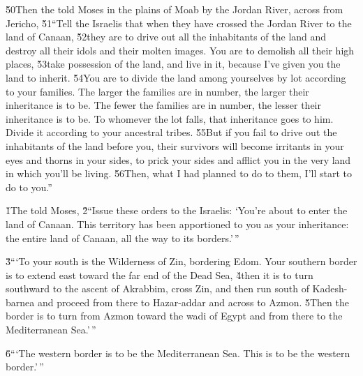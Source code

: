 \v{50}Then the  told Moses in the plains of Moab by the Jordan River, across from Jericho, \v{51}``Tell the Israelis that when they have crossed the Jordan River to the land of Canaan, \v{52}they are to drive out all the inhabitants of the land and destroy all their idols and their molten images. You are to demolish all their high places, \v{53}take possession of the land, and live in it, because I've given you the land to inherit. \v{54}You are to divide the land among yourselves by lot according to your families. The larger the families are in number, the larger their inheritance is to be. The fewer the families are in number, the lesser their inheritance is to be. To whomever the lot falls, that inheritance goes to him. Divide it according to your ancestral tribes. \v{55}But if you fail to drive out the inhabitants of the land before you, their survivors will become irritants in your eyes and thorns in your sides, to prick your sides and afflict you in the very land in which you'll be living. \v{56}Then, what I had planned to do to them, I'll start to do to you.''

\v{1}The  told Moses, \v{2}``Issue these orders to the Israelis: `You're about to enter the land of Canaan. This territory has been apportioned to you as your inheritance: the entire land of Canaan, all the way to its borders.'\,''

\v{3}```To your south is the Wilderness of Zin, bordering Edom. Your southern border is to extend east toward the far end of the Dead Sea, \v{4}then it is to turn southward to the ascent of Akrabbim, cross Zin, and then run south of Kadesh-barnea and proceed from there to Hazar-addar and across to Azmon. \v{5}Then the border is to turn from Azmon toward the wadi of Egypt and from there to the Mediterranean Sea.'\,''

\v{6}```The western border is to be the Mediterranean Sea. This is to be the western border.'\,''


